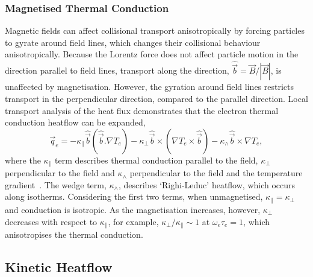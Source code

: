 \subsubsection{Magnetised Thermal Conduction}%
\label{sec:theory_magheatflow}

Magnetic fields can affect collisional transport anisotropically by forcing particles to gyrate around field lines, which changes their collisional behaviour anisotropically.
Because the Lorentz force does not affect particle motion in the direction parallel to field lines, transport along the direction, $\hat{\vec{b}}=\vec{B}/|\vec{B}|$, is unaffected by magnetisation.
However, the gyration around field lines restricts transport in the perpendicular direction, compared to the parallel direction.
Local transport analysis of the heat flux demonstrates that the electron thermal conduction heatflow can be expanded,
\begin{equation}
    \vec{q}_e = - \kappa_{\parallel} \hat{\vec{b}} \left( \hat{\vec{b}}.\nabla T_e \right) - \kappa_{\perp} \hat{\vec{b}} \times \left( \nabla T_e \times \hat{\vec{b}} \right) - \kappa_{\wedge} \hat{\vec{b}} \times \nabla T_e,
\end{equation}
where the $\kappa_{\parallel}$ term describes thermal conduction parallel to the field, $\kappa_{\perp}$ perpendicular to the field and $\kappa_{\wedge}$ perpendicular to the field and the temperature gradient~\cite{epperlein_plasma_1986}.
The wedge term, $\kappa_{\wedge}$, describes `Righi-Leduc' heatflow, which occurs along isotherms.
Considering the first two terms, when unmagnetised, $\kappa_{\parallel}=\kappa_{\perp}$ and conduction is isotropic.
As the magnetisation increases, however, $\kappa_{\perp}$ decreases with respect to $\kappa_{\parallel}$, for example, $\kappa_{\perp}/\kappa_{\parallel} \sim 1$ at $\omega_e\tau_e = 1$, which anisotropises the thermal conduction.

\subsection{Kinetic Heatflow}%
\label{sec:theory_kineticheatflow}

